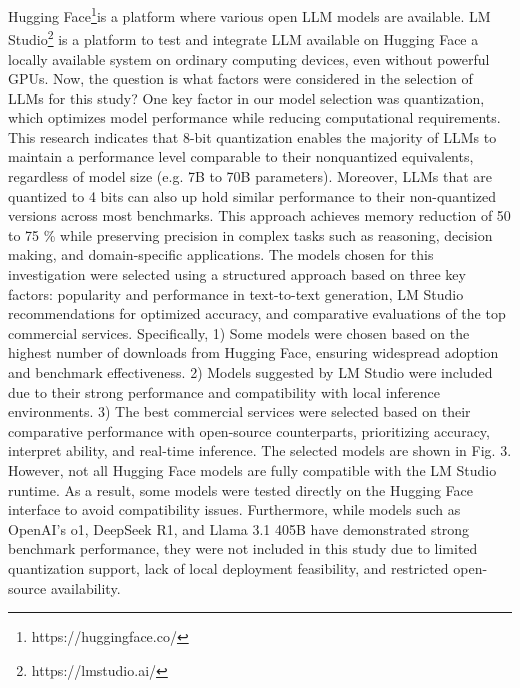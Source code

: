 \documentclass[conference]{IEEEtran}
\begin{document}
Hugging Face\footnote{https://huggingface.co/}is a platform where various open LLM models are available. LM Studio\footnote{https://lmstudio.ai/} is a platform to test and integrate LLM available on Hugging Face a locally available system on ordinary computing devices, even without powerful GPUs. Now, the question is what factors were considered in the selection of LLMs for this study? One key factor in our model selection was quantization, which optimizes model performance while reducing computational requirements. This research \cite{Jin2024ACE} indicates that 8-bit quantization enables the majority of LLMs to maintain a performance level comparable to their nonquantized equivalents, regardless of model size (e.g. 7B to 70B parameters). Moreover, LLMs that are quantized to 4 bits can also up hold similar performance to their non-quantized versions across most benchmarks. This approach achieves memory reduction of 50 to 75 \% while preserving precision in complex tasks such as reasoning, decision making, and domain-specific applications. 
The models chosen for this investigation were selected using a structured approach based on three key factors: popularity and performance in text-to-text generation, LM Studio recommendations for optimized accuracy, and comparative evaluations of the top commercial services. Specifically, 1) Some models were chosen based on the highest number of downloads from Hugging Face, ensuring widespread adoption and benchmark effectiveness. 2) Models suggested by LM Studio were included due to their strong performance and compatibility with local inference environments. 3) The best commercial services were selected based on their comparative performance with open-source counterparts, prioritizing accuracy, interpret ability, and real-time inference. The selected models are shown in Fig. 3. However, not all Hugging Face models are fully compatible with the LM Studio runtime. As a result, some models were tested directly on the Hugging Face interface to avoid compatibility issues. Furthermore, while models such as OpenAI’s o1, DeepSeek R1, and Llama 3.1 405B have demonstrated strong benchmark performance, they were not included in this study due to limited quantization support, lack of local deployment feasibility, and restricted open-source availability.

\end{document}
